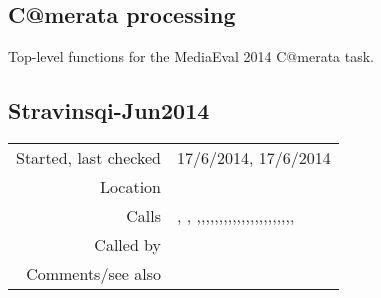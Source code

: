 \subsection{C@merata processing}\label{sec:c@merata-processing}

Top-level functions for the MediaEval 2014
C@merata task.


\subsection*{Stravinsqi-Jun2014}\label{fun:Stravinsqi-Jun2014}

\vspace{0.3cm}
\begin{tabular}{r|p{8cm}}
Started, last checked & 17/6/2014, 17/6/2014 \\
Location & \nameref{sec:c@merata-processing} \\
Calls & \nameref{fun:append-ontimes-to-time-signatures}, \nameref{fun:articulation-and-event-time-intervals}, \nameref{fun:c@merata2014-question-file2question-string},\newline \nameref{fun:c@merata2014-write-answer},\newline \nameref{fun:cadence-time-intervals},\newline \nameref{fun:cross-check-compound-questions},\newline \nameref{fun:duration-time-intervals},\newline \nameref{fun:duration-n-pitch-class-time-intervals},\newline \nameref{fun:followed-by-splitter},\newline \nameref{fun:harmonic-interval-of-a},\newline \nameref{fun:index-item-1st-doesnt-occur},\newline \nameref{fun:kern-file2dataset-by-col},\newline \nameref{fun:kern-file2ontimes-signatures},\newline \nameref{fun:kern-file2tie-set-by-col},\newline \nameref{fun:nadir-apex-time-intervals},\newline \nameref{fun:pitch-class-time-intervals},\newline \nameref{fun:melodic-interval-of-a},\newline \nameref{fun:rest-duration-time-intervals},\newline \nameref{fun:staves-info2staff-n-clef-names},\newline \nameref{fun:texture-time-intervals},\newline \nameref{fun:tied-and-event-time-intervals},\newline \nameref{fun:triad-time-intervals},\newline \nameref{fun:triad-inversion-time-intervals},\newline \nameref{fun:word-time-intervals},\newline \nameref{fun:word-and-event-time-intervals} \\
Called by & \\
Comments/see also &
\end{tabular}

